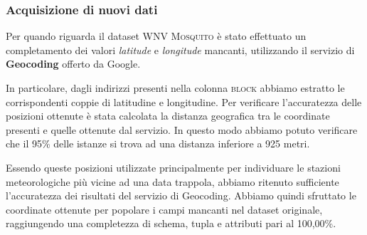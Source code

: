 \subsubsection{Acquisizione di nuovi dati}
Per quando riguarda il dataset \textsc{WNV Mosquito} è stato effettuato un 
completamento dei valori \textit{latitude} e \textit{longitude} mancanti, 
utilizzando il servizio di \textbf{Geocoding} offerto da Google.

In particolare, dagli indirizzi presenti nella colonna \textsc{block} abbiamo 
estratto le corrispondenti coppie di latitudine e longitudine. 
Per verificare l'accuratezza delle posizioni ottenute è stata calcolata la 
distanza geografica tra le coordinate presenti e quelle ottenute dal servizio. 
In questo modo abbiamo potuto verificare che il 95\% delle istanze si trova ad 
una distanza inferiore a 925 metri.

Essendo queste posizioni utilizzate principalmente per individuare le stazioni 
meteorologiche più vicine ad una data trappola, abbiamo ritenuto sufficiente 
l'accuratezza dei risultati del servizio di Geocoding. Abbiamo quindi sfruttato 
le coordinate ottenute per popolare i campi mancanti nel dataset originale, 
raggiungendo una completezza di schema, tupla e attributi pari al 100,00\%.

